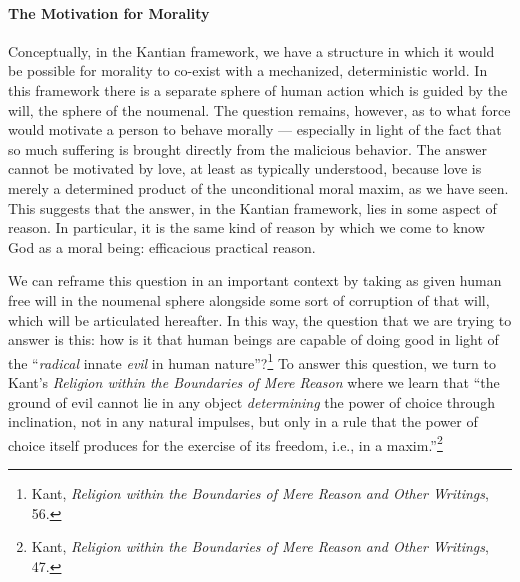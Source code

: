 \documentclass[12pt]{article}
\begin{document}
	\paragraph*{The Motivation for Morality} Conceptually, in the Kantian framework, we have a structure in which it would be possible for morality to co-exist with a mechanized, deterministic world. In this framework there is a separate sphere of human action which is guided by the will, the sphere of the noumenal. The question remains, however, as to what force would motivate a person to behave morally --- especially in light of the fact that so much suffering is brought directly from the malicious behavior. The answer cannot be motivated by love, at least as typically understood, because love is merely a determined product of the unconditional moral maxim, as we have seen. This suggests that the answer, in the Kantian framework, lies in some aspect of reason. In particular, it is the same kind of reason by which we come to know God as a moral being: efficacious practical reason.
	
	We can reframe this question in an important context by taking as given human free will in the noumenal sphere alongside some sort of corruption of that will, which will be articulated hereafter. In this way, the question that we are trying to answer is this: how is it that human beings are capable of doing good in light of the ``\emph{radical} innate \emph{evil} in human nature''?\footnote{Kant, \emph{Religion within the Boundaries of Mere Reason and Other Writings}, 56.} To answer this question, we turn to Kant's \emph{Religion within the Boundaries of Mere Reason} where we learn that ``the ground of evil cannot lie in any object \emph{determining} the power of choice through inclination, not in any natural impulses, but only in a rule that the power of choice itself produces for the exercise of its freedom, i.e., in a maxim.''\footnote{Kant, \emph{Religion within the Boundaries of Mere Reason and Other Writings}, 47.}
\end{document}
